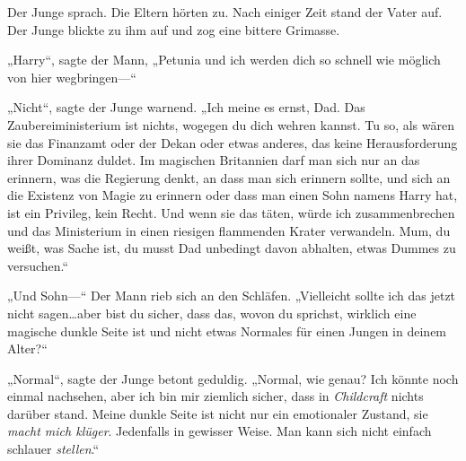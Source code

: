 
Der Junge sprach. Die Eltern hörten zu. Nach einiger Zeit stand der Vater auf. Der Junge blickte zu ihm auf und zog eine bittere Grimasse.

„Harry“, sagte der Mann, „Petunia und ich werden dich so schnell wie möglich von hier wegbringen—“

„Nicht“, sagte der Junge warnend. „Ich meine es ernst, Dad. Das Zaubereiministerium ist nichts, wogegen du dich wehren kannst. Tu so, als wären sie das Finanzamt oder der Dekan oder etwas anderes, das keine Herausforderung ihrer Dominanz duldet. Im magischen Britannien darf man sich nur an das erinnern, was die Regierung denkt, an dass man sich erinnern sollte, und sich an die Existenz von Magie zu erinnern oder dass man einen Sohn namens Harry hat, ist ein Privileg, kein Recht. Und wenn sie das täten, würde ich zusammenbrechen und das Ministerium in einen riesigen flammenden Krater verwandeln. Mum, du weißt, was Sache ist, du musst Dad unbedingt davon abhalten, etwas Dummes zu versuchen.“

„Und Sohn—“ Der Mann rieb sich an den Schläfen. „Vielleicht sollte ich das jetzt nicht sagen…aber bist du sicher, dass das, wovon du sprichst, wirklich eine magische dunkle Seite ist und nicht etwas Normales für einen Jungen in deinem Alter?“

„Normal“, sagte der Junge betont geduldig. „Normal, wie genau? Ich könnte noch einmal nachsehen, aber ich bin mir ziemlich sicher, dass in \emph{Childcraft} nichts darüber stand. Meine dunkle Seite ist nicht nur ein emotionaler Zustand, sie \emph{macht mich klüger}. Jedenfalls in gewisser Weise. Man kann sich nicht einfach schlauer \emph{stellen}.“

